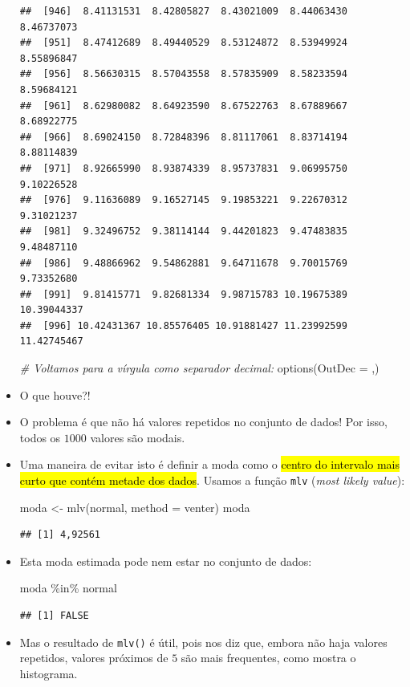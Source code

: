 \documentclass[
  11pt]{report}
\newenvironment{Shaded}{\begin{snugshade}}{\end{snugshade}}
\newcommand{\AttributeTok}[1]{\textcolor[rgb]{0.77,0.63,0.00}{#1}}
\newcommand{\CommentTok}[1]{\textcolor[rgb]{0.56,0.35,0.01}{\textit{#1}}}
\newcommand{\FunctionTok}[1]{\textcolor[rgb]{0.00,0.00,0.00}{#1}}
\newcommand{\NormalTok}[1]{#1}
\newcommand{\OtherTok}[1]{\textcolor[rgb]{0.56,0.35,0.01}{#1}}
\newcommand{\SpecialCharTok}[1]{\textcolor[rgb]{0.00,0.00,0.00}{#1}}
\newcommand{\StringTok}[1]{\textcolor[rgb]{0.31,0.60,0.02}{#1}}
\renewenvironment{Shaded}{
    \begin{mdframed}[%
      roundcorner=2pt,%
      innerleftmargin=5pt,%
      innerrightmargin=5pt,%
      topline=true,%
      leftline=true,%
      rightline=true,%
      bottomline=true,%
      linewidth=0.5pt,%
      linecolor=black!20,%
      backgroundcolor=black!2,%
      skipabove=2ex,%
      skipbelow=2.5ex%
    ]%
  }
  {
    \end{mdframed}
  }
\begin{document}
\begin{itemize}
\begin{verbatim}
##  [946]  8.41131531  8.42805827  8.43021009  8.44063430  8.46737073
##  [951]  8.47412689  8.49440529  8.53124872  8.53949924  8.55896847
##  [956]  8.56630315  8.57043558  8.57835909  8.58233594  8.59684121
##  [961]  8.62980082  8.64923590  8.67522763  8.67889667  8.68922775
##  [966]  8.69024150  8.72848396  8.81117061  8.83714194  8.88114839
##  [971]  8.92665990  8.93874339  8.95737831  9.06995750  9.10226528
##  [976]  9.11636089  9.16527145  9.19853221  9.22670312  9.31021237
##  [981]  9.32496752  9.38114144  9.44201823  9.47483835  9.48487110
##  [986]  9.48866962  9.54862881  9.64711678  9.70015769  9.73352680
##  [991]  9.81415771  9.82681334  9.98715783 10.19675389 10.39044337
##  [996] 10.42431367 10.85576405 10.91881427 11.23992599 11.42745467
\end{verbatim}

\begin{Shaded}
\begin{Highlighting}[]
\CommentTok{\# Voltamos para a vírgula como separador decimal:}
\FunctionTok{options}\NormalTok{(}\AttributeTok{OutDec =} \StringTok{\textquotesingle{},\textquotesingle{}}\NormalTok{)}
\end{Highlighting}
\end{Shaded}
\item
  O que houve?!
\item
  O problema é que não há valores repetidos no conjunto de dados! Por isso, todos os $1000$ valores são modais.
\item
  Uma maneira de evitar isto é definir a moda como o {\hl{centro do intervalo mais curto que contém metade dos dados}}. Usamos a função \texttt{mlv} (\emph{most likely value}):

\begin{Shaded}
\begin{Highlighting}[]
\NormalTok{moda }\OtherTok{\textless{}{-}} \FunctionTok{mlv}\NormalTok{(normal, }\AttributeTok{method =} \StringTok{\textquotesingle{}venter\textquotesingle{}}\NormalTok{)}
\NormalTok{moda}
\end{Highlighting}
\end{Shaded}

\begin{verbatim}
## [1] 4,92561
\end{verbatim}
\item
  Esta moda estimada pode nem estar no conjunto de dados:

\begin{Shaded}
\begin{Highlighting}[]
\NormalTok{moda }\SpecialCharTok{\%in\%}\NormalTok{ normal}
\end{Highlighting}
\end{Shaded}

\begin{verbatim}
## [1] FALSE
\end{verbatim}
\item
  Mas o resultado de \texttt{mlv()} é útil, pois nos diz que, embora não haja valores repetidos, valores próximos de $5$ são mais frequentes, como mostra o histograma.
\end{itemize}
\end{document}
